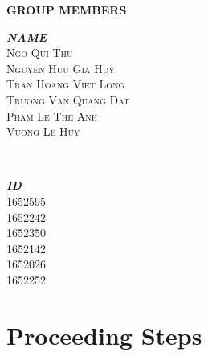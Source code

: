 \documentclass[12pt]{extarticle}
\newcommand{\<}{\langle}
\renewcommand{\>}{\rangle}
\theoremstyle{definition}
\begin{document}
\begin{center}
{\huge\bfseries GROUP MEMBERS}\\[1cm]

\end{center}
	\begin{minipage}{0.5\textwidth}
		\begin{flushleft}
			\large
			\textit{{\huge\bfseries NAME}\\[0.5cm]}
			 \textsc{{Ngo Qui Thu}\\[0.2cm]}
			 \textsc{{Nguyen Huu Gia Huy}\\[0.2cm]}
			 \textsc{{Tran Hoang Viet Long}\\[0.2cm]}
			 \textsc{{Truong Van Quang Dat}\\[0.2cm]}
			 \textsc{{Pham Le The Anh}\\[0.2cm]}
			 \textsc{{Vuong Le Huy}\\[0.2cm]}
		\end{flushleft}
	\end{minipage}
	~
	\begin{minipage}{0.5\textwidth}
		\begin{flushright}
			\large
			\textit{{\huge\bfseries ID}\\[0.5cm]}
			 \textsc{{1652595}\\[0.2cm]}
			 \textsc{{1652242}\\[0.2cm]}
			 \textsc{{1652350}\\[0.2cm]}
			 \textsc{{1652142}\\[0.2cm]}
			 \textsc{{1652026}\\[0.2cm]}
			 \textsc{{1652252}\\[0.2cm]}
		\end{flushright}
	\end{minipage}
\clearpage


{\large\tableofcontents}


\maketitle

\section{Proceeding Steps}
\end{document}
